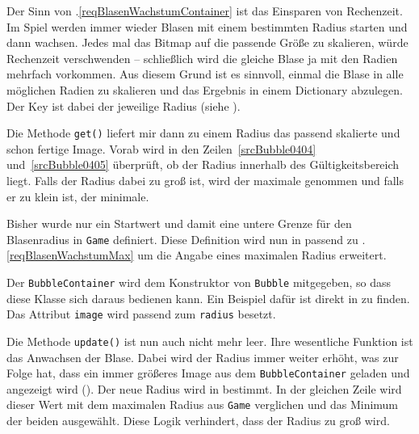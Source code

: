 Der Sinn von .\ref{reqBlasenWachstumContainer} ist das Einsparen von Rechenzeit. Im Spiel werden immer wieder Blasen mit einem bestimmten Radius starten und dann wachsen. Jedes mal das Bitmap auf die passende Größe zu skalieren, würde Rechenzeit verschwenden -- schließlich wird die gleiche Blase ja mit den Radien mehrfach vorkommen. Aus diesem Grund ist es sinnvoll, einmal die Blase in alle möglichen Radien zu skalieren und das Ergebnis in einem Dictionary abzulegen. Der Key ist dabei der jeweilige Radius (siehe ).

Die Methode \texttt{get()} liefert mir dann zu einem Radius das passend skalierte und schon fertige Image. Vorab wird in den Zeilen~\ref{srcBubble0404} und~\ref{srcBubble0405} überprüft, ob der Radius innerhalb des Gültigkeitsbereich liegt. Falls der Radius dabei zu groß ist, wird der maximale genommen und falls er zu klein ist, der minimale.


Bisher wurde nur ein Startwert und damit eine untere Grenze für den Blasenradius in \texttt{Game} definiert. Diese Definition wird nun in  passend zu .\ref{reqBlasenWachstumMax} um die Angabe eines maximalen Radius erweitert.


Der \texttt{BubbleContainer} wird dem Konstruktor von \texttt{Bubble} mitgegeben, so dass diese Klasse sich daraus bedienen kann. Ein Beispiel dafür ist direkt in  zu finden. Das Attribut \texttt{image} wird passend zum \texttt{radius} besetzt.

Die Methode \texttt{update()} ist nun auch nicht mehr leer. Ihre wesentliche Funktion ist das Anwachsen der Blase. Dabei wird der Radius immer weiter erhöht, was zur Folge hat, dass ein immer größeres Image aus dem \texttt{BubbleContainer} geladen und angezeigt wird (). Der neue Radius wird in  bestimmt. In der gleichen Zeile wird dieser Wert mit dem maximalen Radius aus \texttt{Game} verglichen und das Minimum der beiden ausgewählt. Diese Logik verhindert, dass der Radius zu groß wird.

